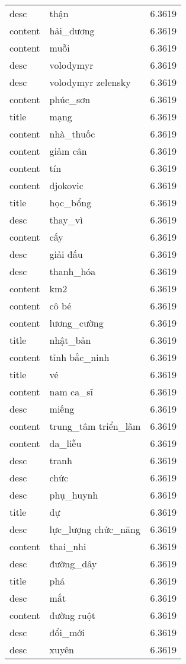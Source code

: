 \documentclass{article}
\begin{document}
\begin{tabular}{lll}
desc & thận & 6.3619\\
content & hải\_dương & 6.3619\\
content & muỗi & 6.3619\\
desc & volodymyr & 6.3619\\
desc & volodymyr zelensky & 6.3619\\
content & phúc\_sơn & 6.3619\\
title & mạng & 6.3619\\
content & nhà\_thuốc & 6.3619\\
content & giảm cân & 6.3619\\
content & tín & 6.3619\\
content & djokovic & 6.3619\\
title & học\_bổng & 6.3619\\
desc & thay\_vì & 6.3619\\
content & cấy & 6.3619\\
desc & giải đấu & 6.3619\\
desc & thanh\_hóa & 6.3619\\
content & km2 & 6.3619\\
content & cô bé & 6.3619\\
content & lương\_cường & 6.3619\\
title & nhật\_bản & 6.3619\\
content & tỉnh bắc\_ninh & 6.3619\\
title & vé & 6.3619\\
content & nam ca\_sĩ & 6.3619\\
desc & miếng & 6.3619\\
content & trung\_tâm triển\_lãm & 6.3619\\
content & da\_liễu & 6.3619\\
desc & tranh & 6.3619\\
desc & chức & 6.3619\\
desc & phụ\_huynh & 6.3619\\
title & dự & 6.3619\\
desc & lực\_lượng chức\_năng & 6.3619\\
content & thai\_nhi & 6.3619\\
desc & đường\_dây & 6.3619\\
title & phá & 6.3619\\
desc & mắt & 6.3619\\
content & đường ruột & 6.3619\\
desc & đổi\_mới & 6.3619\\
desc & xuyên & 6.3619\\

\end{tabular}
\end{document}

